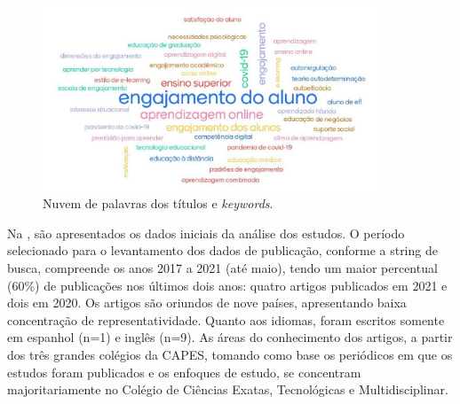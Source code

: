 \documentclass[portuguese]{textolivre}
\begin{document}
\begin{figure}[htbp]
 \centering
 \includegraphics[width=0.90\textwidth]{fig3-35747.png}
 \caption{Nuvem de palavras dos títulos e \emph{keywords}.}
 \label{fig3}
\end{figure}

Na , são apresentados os dados iniciais da análise dos estudos. O período selecionado para o levantamento dos dados de publicação, conforme a string de busca, compreende os anos 2017 a 2021 (até maio), tendo um maior percentual (60\%) de publicações nos últimos dois anos: quatro artigos publicados em 2021 e dois em 2020. Os artigos são oriundos de nove países, apresentando baixa concentração de representatividade. Quanto aos idiomas, foram escritos somente em espanhol (n=1) e inglês (n=9). As áreas do conhecimento dos artigos, a partir dos três grandes colégios da CAPES, tomando como base os periódicos em que os estudos foram publicados e os enfoques de estudo, se concentram majoritariamente no Colégio de Ciências Exatas, Tecnológicas e Multidisciplinar.  
\end{document}
